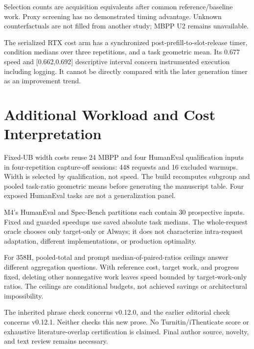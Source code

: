 \documentclass[preprint,12pt,nopreprintline]{elsarticle}
\begin{document}
Selection counts are acquisition equivalents after common reference/baseline work. Proxy screening has no demonstrated timing advantage. Unknown counterfactuals are not filled from another study; MBPP U2 remains unavailable.

The serialized RTX cost arm has a synchronized post-prefill-to-slot-release timer, condition medians over three repetitions, and a task geometric mean. Its 0.677 speed and [0.662,0.692] descriptive interval concern instrumented execution including logging. It cannot be directly compared with the later generation timer as an improvement trend.


\section{Additional Workload and Cost Interpretation}
Fixed-UB width costs reuse 24 MBPP and four HumanEval qualification inputs in four-repetition capture-off sessions: 448 requests and 16 excluded warmups. Width is selected by qualification, not speed. The build recomputes subgroup and pooled task-ratio geometric means before generating the manuscript table. Four exposed HumanEval tasks are not a generalization panel.

M4's HumanEval and Spec-Bench partitions each contain 30 prospective inputs. Fixed and guarded speedups use saved absolute task medians. The whole-request oracle chooses only target-only or Always; it does not characterize intra-request adaptation, different implementations, or production optimality.

For 358H, pooled-total and prompt median-of-paired-ratios ceilings answer different aggregation questions. With reference cost, target work, and progress fixed, deleting other nonnegative work leaves speed bounded by target-work-only ratios. The ceilings are conditional budgets, not achieved savings or architectural impossibility.

The inherited phrase check concerns v0.12.0, and the earlier editorial check concerns v0.12.1. Neither checks this new prose. No Turnitin/iThenticate score or exhaustive literature-overlap certification is claimed. Final author source, novelty, and text review remains necessary.
\end{document}
